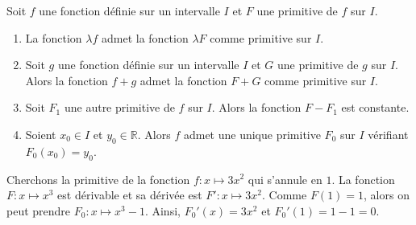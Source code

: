       \begin{thm}
      Soit $f$ une fonction d\'efinie sur un intervalle $I$ et $F$ une primitive de $f$ sur $I$.
      \begin{enumerate}
            \item 
                  La fonction $\lambda f$ admet la fonction $\lambda F$ comme primitive sur $I$.
            \item 
                  Soit $g$ une fonction d\'efinie sur un intervalle $I$ et $G$ une primitive de $g$ sur $I$.
                  Alors la fonction $f+g$ admet la fonction $F+G$ comme primitive sur $I$.      
            \item 
                  Soit $F_1$ une autre primitive de $f$ sur $I$.
                  Alors la fonction $F - F_1$ est constante.
            \item 
                  Soient $x_0\in I$ et $y_0\in \mathbb{R}$.
                  Alors $f$ admet une unique primitive $F_0$ sur $I$ v\'erifiant $F_0 (x_0) = y_0$.
      \end{enumerate}
            \begin{ex}
                  Cherchons la primitive de la fonction $f:x\mapsto 3 x^2$ qui s'annule en $1$.
                  La fonction $F:x\mapsto x^3$ est d\'erivable et sa d\'eriv\'ee est $F':x\mapsto 3x^2$.
                  Comme $F(1)=1$, alors on peut prendre $F_0 : x\mapsto x^3 - 1$.
                  Ainsi, $F_0' (x) = 3x^2$ et $F_0' (1) = 1 - 1 = 0$.
            \end{ex}
      \end{thm}
%
